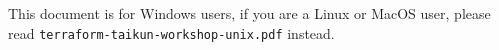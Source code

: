 \begin{warn}
  This document is for Windows users, if you are a Linux or MacOS user, please read \texttt{terraform-taikun-workshop-unix.pdf} instead.
\end{warn}
